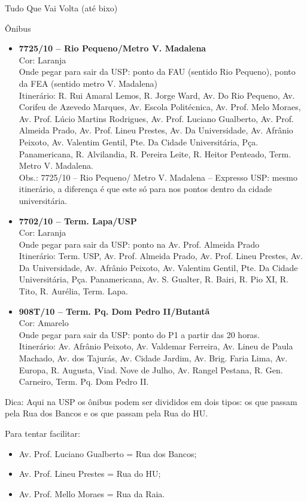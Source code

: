 \begin{secao}{Tudo Que Vai Volta (até bixo)}
\begin{subsecao}{Ônibus}
\begin{itemize}
	\item {\bf 7725/10 – Rio Pequeno/Metro V. Madalena}\\
	Cor: Laranja\\
	Onde pegar para sair da USP: ponto da FAU (sentido Rio Pequeno), ponto da
	FEA (sentido metro V. Madalena)\\
	Itinerário: R. Rui Amaral Lemos, R. Jorge Ward, Av. Do Rio Pequeno, Av.
	Corifeu de Azevedo Marques, Av. Escola Politécnica, Av. Prof. Melo Moraes,
	Av. Prof. Lúcio Martins Rodrigues, Av. Prof. Luciano Gualberto, Av. Prof.
	Almeida Prado, Av. Prof. Lineu Prestes, Av. Da Universidade, Av. Afrânio
	Peixoto, Av. Valentim Gentil, Pte. Da Cidade Universitária, Pça. 
	Panamericana, R. Alvilandia, R. Pereira Leite, R. Heitor Penteado, Term.
	Metro V. Madalena.\\

	Obs.: 7725/10 – Rio Pequeno/ Metro V. Madalena – Expresso USP: mesmo
	itinerário, a diferença é que este só para nos pontos dentro da cidade
	universitária.

	\item {\bf 7702/10 – Term. Lapa/USP}\\
	Cor: Laranja\\
	Onde pegar para sair da USP: ponto na Av. Prof. Almeida Prado\\
	Itinerário: Term. USP, Av. Prof. Almeida Prado, Av. Prof. Lineu Prestes,
	Av. Da Universidade, Av. Afrânio Peixoto, Av. Valentim Gentil, Pte. Da
	Cidade Universitária, Pça. Panamericana, Av. S. Gualter, R. Bairi, R. Pio
	XI, R. Tito, R. Aurélia, Term. Lapa.

	\item {\bf 908T/10 – Term. Pq. Dom Pedro II/Butantã}\\
	Cor: Amarelo\\
	Onde pegar para sair da USP: ponto do P1 a partir das 20 horas.\\
	Itinerário: Av. Afrânio Peixoto, Av. Valdemar Ferreira, Av. Lineu de Paula
	Machado, Av. dos Tajurás, Av. Cidade Jardim, Av. Brig. Faria Lima, Av. 
	Europa, R. Augusta, Viad. Nove de Julho, Av. Rangel Pestana, R. Gen. 
	Carneiro, Term. Pq. Dom Pedro II.
  
\end{itemize}

Dica: Aqui na USP os ônibus podem ser divididos em dois tipos: os que passam
pela Rua dos Bancos e os que passam pela Rua do HU.

Para tentar facilitar:
\begin{itemize}
	\item Av. Prof. Luciano Gualberto = Rua dos Bancos;
	\item Av. Prof. Lineu Prestes = Rua do HU;
	\item Av. Prof. Mello Moraes = Rua da Raia.
\end{itemize}


\end{subsecao}
\end{secao}

